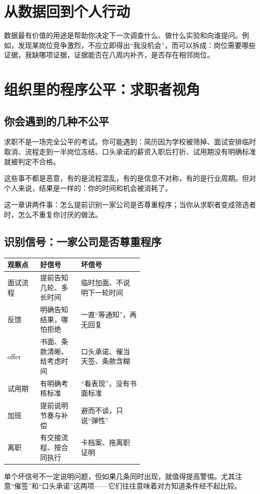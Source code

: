 \documentclass[UTF8,zihao=5,openany]{ctexbook}
\begin{document}
\section{从数据回到个人行动}
数据最有价值的用途是帮助你决定下一次调查什么、做什么实验和向谁提问。例如，发现某岗位竞争激烈，不应立即得出“我没机会”，而可以拆成：岗位需要哪些证据，我缺哪项证据，证据能否在八周内补齐，是否存在相邻岗位。

\section{组织里的程序公平：求职者视角}
\subsection{你会遇到的几种不公平}
求职不是一场完全公平的考试。你可能遇到：简历因为学校被筛掉、面试安排临时取消、流程走到一半岗位冻结、口头承诺的薪资入职后打折、试用期没有明确标准就被判定不合格。

这些事不都是恶意，有的是流程混乱，有的是信息不对称，有的是行业周期。但对个人来说，结果是一样的：你的时间和机会被消耗了。

这一章讲两件事：怎么提前识别一家公司是否尊重程序；当你从求职者变成筛选者时，怎么不重复你讨厌的做法。

\subsection{识别信号：一家公司是否尊重程序}
\begin{center}\small
\begin{tabularx}{\linewidth}{p{0.24\linewidth}p{0.30\linewidth}Y}
\toprule
观察点 & 好信号 & 坏信号 \\
\midrule
面试流程 & 提前告知几轮、多长时间 & 临时加面、不说明下一轮时间 \\
反馈 & 明确告知结果，哪怕拒绝 & 一直“等通知”，再无回复 \\
offer & 书面、条款清晰、给考虑时间 & 口头承诺、催当天签、条款含糊 \\
试用期 & 有明确考核标准 & “看表现”，没有书面标准 \\
加班 & 提前说明节奏与补偿 & 避而不谈，只说“弹性” \\
离职 & 有交接流程、按合同执行 & 卡档案、拖离职证明 \\
\bottomrule
\end{tabularx}
\end{center}

单个坏信号不一定说明问题，但如果几条同时出现，就值得提高警惕。尤其注意“催签”和“口头承诺”这两项——它们往往意味着对方知道条件经不起比较。
\end{document}
